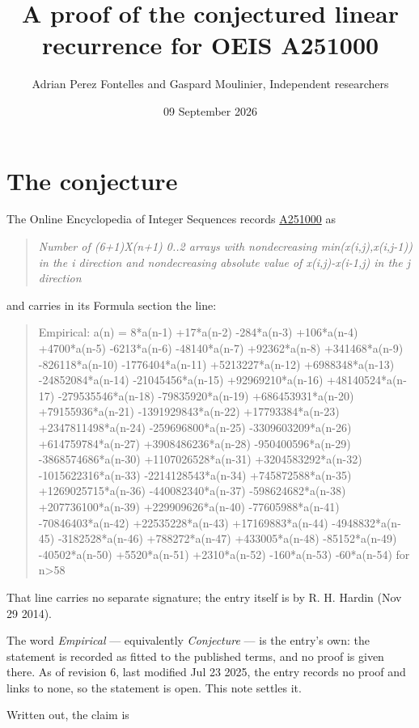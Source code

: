 \documentclass[11pt]{article}
\title{A proof of the conjectured linear recurrence for OEIS A251000}
\author{Adrian Perez Fontelles and Gaspard Moulinier, Independent researchers}
\date{09 September 2026}
\theoremstyle{definition}
\begin{document}
\maketitle
\section{The conjecture}

The Online Encyclopedia of Integer Sequences records \href{https://oeis.org/A251000}{A251000} as

\begin{quote}\itshape Number of (6+1)X(n+1) 0..2 arrays with nondecreasing min(x(i,j),x(i,j-1)) in the i direction and nondecreasing absolute value of x(i,j)-x(i-1,j) in the j direction\end{quote}

and carries in its Formula section the line:

\begin{quote}\ttfamily Empirical: a(n) = 8*a(n-1) +17*a(n-2) -284*a(n-3) +106*a(n-4) +4700*a(n-5) -6213*a(n-6) -48140*a(n-7) +92362*a(n-8) +341468*a(n-9) -826118*a(n-10) -1776404*a(n-11) +5213227*a(n-12) +6988348*a(n-13) -24852084*a(n-14) -21045456*a(n-15) +92969210*a(n-16) +48140524*a(n-17) -279535546*a(n-18) -79835920*a(n-19) +686453931*a(n-20) +79155936*a(n-21) -1391929843*a(n-22) +17793384*a(n-23) +2347811498*a(n-24) -259696800*a(n-25) -3309603209*a(n-26) +614759784*a(n-27) +3908486236*a(n-28) -950400596*a(n-29) -3868574686*a(n-30) +1107026528*a(n-31) +3204583292*a(n-32) -1015622316*a(n-33) -2214128543*a(n-34) +745872588*a(n-35) +1269025715*a(n-36) -440082340*a(n-37) -598624682*a(n-38) +207736100*a(n-39) +229909626*a(n-40) -77605988*a(n-41) -70846403*a(n-42) +22535228*a(n-43) +17169883*a(n-44) -4948832*a(n-45) -3182528*a(n-46) +788272*a(n-47) +433005*a(n-48) -85152*a(n-49) -40502*a(n-50) +5520*a(n-51) +2310*a(n-52) -160*a(n-53) -60*a(n-54) for n>58\end{quote}

That line carries no separate signature; the entry itself is by R. H. Hardin (Nov 29 2014).

The word {\itshape Empirical} --- equivalently {\itshape Conjecture} --- is the entry's own: the statement is recorded as fitted to the published terms, and no proof is given there. As of revision 6, last modified Jul 23 2025, the entry records no proof and links to none, so the statement is open. This note settles it.

Written out, the claim is
\end{document}
